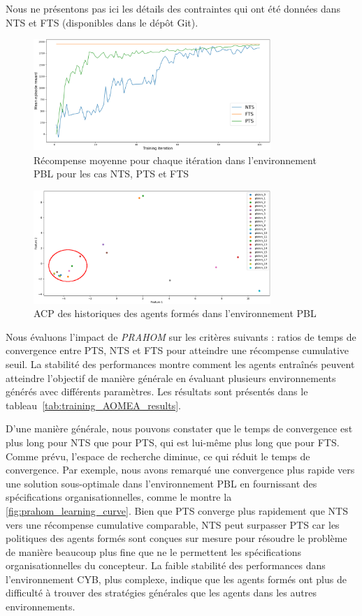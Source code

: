 \noindent Nous ne présentons pas ici les détails des contraintes qui ont été données dans NTS et FTS (disponibles dans le dépôt Git\footnotemark[1]).
%
\begin{figure}[h!]
    \centering
    \includegraphics[width=0.8\textwidth]{figures/prahom_learning_curve.png}
    \caption{Récompense moyenne pour chaque itération dans l'environnement PBL pour les cas NTS, PTS et FTS}
    \label{fig:prahom_learning_curve}
\end{figure}
%
\begin{figure}[h!]
    \centering
    \includegraphics[width=0.8\textwidth]{figures/prahom_pca_analysis.png}
    \caption{ACP des historiques des agents formés dans l'environnement PBL}
    \label{fig:prahom_pca_analysis}
\end{figure}
%
Nous évaluons l'impact de \emph{PRAHOM} sur les critères suivants : ratios de temps de convergence entre PTS, NTS et FTS pour atteindre une récompense cumulative seuil. La stabilité des performances montre comment les agents entraînés peuvent atteindre l'objectif de manière générale en évaluant plusieurs environnements générés avec différents paramètres. Les résultats sont présentés dans le tableau~\ref{tab:training_AOMEA_results}.
%

%
D'une manière générale, nous pouvons constater que le temps de convergence est plus long pour NTS que pour PTS, qui est lui-même plus long que pour FTS. Comme prévu, l'espace de recherche diminue, ce qui réduit le temps de convergence. Par exemple, nous avons remarqué une convergence plus rapide vers une solution sous-optimale dans l'environnement PBL en fournissant des spécifications organisationnelles, comme le montre la \autoref{fig:prahom_learning_curve}. Bien que PTS converge plus rapidement que NTS vers une récompense cumulative comparable, NTS peut surpasser PTS car les politiques des agents formés sont conçues sur mesure pour résoudre le problème de manière beaucoup plus fine que ne le permettent les spécifications organisationnelles du concepteur. La faible stabilité des performances dans l'environnement CYB, plus complexe, indique que les agents formés ont plus de difficulté à trouver des stratégies générales que les agents dans les autres environnements.

